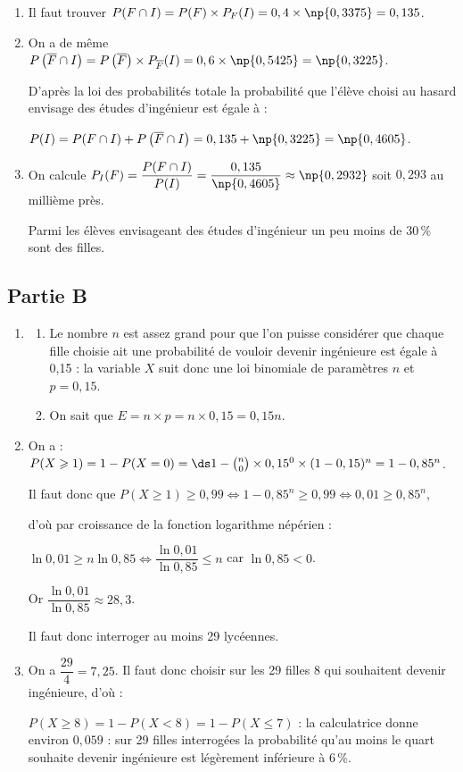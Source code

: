 \begin{enumerate}
	\item Il faut trouver $P(F \cap I)=  P(F) \times P_F(I) = 0,4 \times \np{0,3375} = 0,135$.

	\item On a de même $P\left(\overline{F} \cap I\right)=  P\left(\overline{F}\right) \times P_{\overline{F}}(I) = 0,6 \times \np{0,5425} = \np{0,3225}$.

	D'après la loi des probabilités totale la probabilité que l'élève choisi au hasard envisage des études d'ingénieur est égale à :

	$P(I) = P(F \cap I) + P\left(\overline{F} \cap I\right) = 0,135 + \np{0,3225} = \np{0,4605}$.

	\item On calcule $P_I(F) = \dfrac{P(F \cap I)}{P(I)} = \dfrac{0,135}{\np{0,4605}} \approx \np{0,2932}$ soit $0,293$ au millième près.

	Parmi les élèves envisageant des études d'ingénieur un peu moins de 30\,\% sont des filles.
\end{enumerate}

\subsection*{Partie B}
\begin{enumerate} \item
	\begin{enumerate}
		\item Le nombre $n$ est assez grand pour que l'on puisse considérer que chaque fille choisie ait une probabilité de vouloir devenir ingénieure est égale à 0,15 : la variable $X$ suit donc une loi binomiale de paramètres $n$ et $p = 0,15$.

		\item On sait que $E  = n \times p = n \times 0,15 = 0,15n$.
	\end{enumerate}
	\item On a : $P(X \geqslant 1) = 1 - P(X = 0) =\ds 1 - \binom{n}{0} \times 0,15^0 \times (1 - 0,15)^n = 1 - 0,85^n$.

	Il faut donc que $P(X \geqslant 1) \geqslant 0,99 \iff 1 - 0,85^n \geqslant 0,99 \iff 0,01 \geqslant 0,85^n$,

	d'où par croissance de la fonction logarithme népérien :

	$\ln 0,01 \geqslant n\ln 0,85 \iff \dfrac{\ln 0,01}{\ln 0,85} \leqslant n$ car $\ln 0,85 < 0$.

	Or $\dfrac{\ln 0,01}{\ln 0,85} \approx 28,3$.

	Il faut donc interroger au moins 29 lycéennes.

	\item On a $\dfrac{29}{4} = 7,25$. Il faut donc choisir sur les 29 filles 8 qui souhaitent devenir ingénieure, d'où :

	$P(X\geqslant 8) = 1 - P(X < 8) = 1 - P(X \leqslant 7)
	$ : la calculatrice donne environ $0,059$ : sur 29 filles interrogées la probabilité qu'au moins le quart souhaite devenir ingénieure est légèrement inférieure à 6\,\%.
\end{enumerate}

